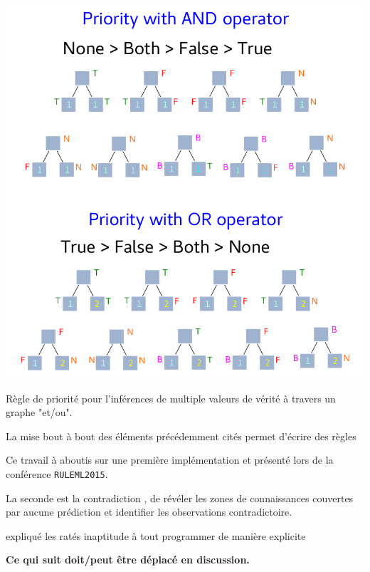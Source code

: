 \begin{refsegment}
\begin{shadedfigure}[H]
    \centering
    \includegraphics[width=\textwidth]{img/four_values_priorities_rules.pdf}
    \caption{ Règle de priorité pour l'inférences de multiple valeurs de vérité à travers un graphe "et/ou". }
    \label{fig:four_truth_values}
\end{shadedfigure}

La mise bout à bout des éléments précédemment cités permet d'écrire des règles

Ce travail à aboutis sur une première implémentation et présenté lors de la conférence \texttt{RULEML2015}.





La seconde est la contradiction
, de révéler les zones de connaissances couvertes par aucune prédiction et identifier les observations contradictoire.

expliqué les ratés
inaptitude à tout programmer de manière explicite

\textbf{Ce qui suit doit/peut être déplacé en discussion.}


\end{refsegment}

